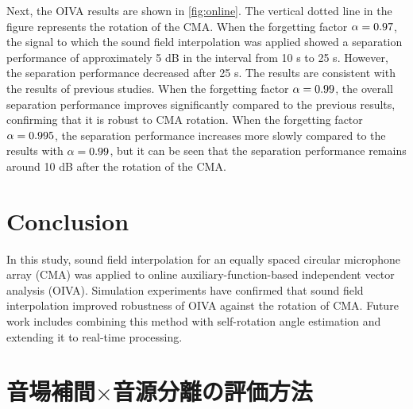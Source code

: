 \documentclass[twocolumn,9pt,dvipdfmx]{article}
\begin{document}
Next, the OIVA results are shown in \cref{fig:online}.
The vertical dotted line in the figure represents the rotation of the CMA.
When the forgetting factor $\alpha = 0.97$, the signal to which the sound field interpolation was applied showed a separation performance of approximately 5 dB in the interval from 10 s to 25 s.
However, the separation performance decreased after 25 s. The results are consistent with the results of previous studies.
When the forgetting factor $\alpha = 0.99 $, the overall separation performance improves significantly compared to the previous results, confirming that it is robust to CMA rotation.
When the forgetting factor $\alpha = 0.995$, the separation performance increases more slowly compared to the results with $\alpha = 0.99$, but it can be seen that the separation performance remains around 10 dB after the rotation of the CMA.

\section{Conclusion}
In this study, sound field interpolation for an equally spaced circular microphone array (CMA) was applied to online auxiliary-function-based independent vector analysis (OIVA).
Simulation experiments have confirmed that sound field interpolation improved robustness of OIVA against the rotation of CMA.
Future work includes combining this method with self-rotation angle estimation \cite{Lian:2021:APSIPA} and extending it to real-time processing.

\clearpage\newpage



\clearpage\newpage
\section*{音場補間$\times$音源分離の評価方法}
\end{document}
